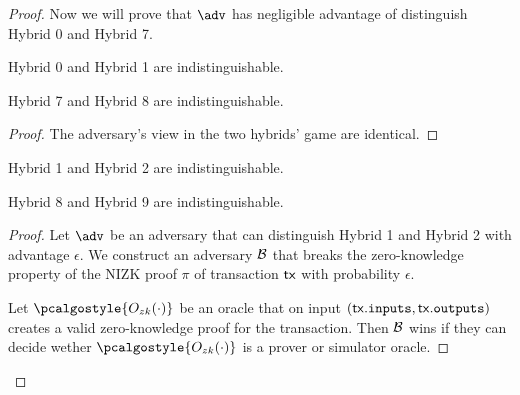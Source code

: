 \begin{proof}
Now we will prove that $\adv$ has negligible advantage of distinguish Hybrid 0 and Hybrid 7. \\
\begin{lemma}
    Hybrid 0 and Hybrid 1 are indistinguishable.
\end{lemma}
\begin{corollary}
    Hybrid 7 and Hybrid 8 are indistinguishable.
\end{corollary}
\begin{proof}
The adversary's view in the two hybrids' game are identical.
\end{proof}

\begin{lemma}
    Hybrid 1 and Hybrid 2 are indistinguishable.
\end{lemma}
\begin{corollary}
    Hybrid 8 and Hybrid 9 are indistinguishable.
\end{corollary}
\begin{proof}
    Let $\adv$ be an adversary that can distinguish Hybrid 1 and Hybrid 2 with advantage $\epsilon$. We construct an adversary $\mathcal{B}$ that breaks the zero-knowledge property of the NIZK proof $\pi$ of transaction $\textup{\textsf{tx}}$ with probability $\epsilon$.
    
    Let $\pcalgostyle{O_{zk}(\cdot)}$ be an oracle that on input $(\textup{\textsf{tx}}.{\textup{\texttt{inputs}}}, \textup{\textsf{tx}}.{\textup{\texttt{outputs}}})$ creates a valid zero-knowledge proof for the transaction. Then $\mathcal{B}$ wins if they can decide wether $\pcalgostyle{O_{zk}(\cdot)}$ is a prover or simulator oracle.
    

\end{proof}
\end{proof}
